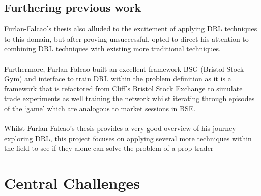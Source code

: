\documentclass[ %
                    author={Ashwinder Khurana},
                supervisor={Prof Dave Cliff},
                    degree={MEng},
                     title={The Deeply Reinforced Trader},
                  subtitle={},
                      type={enterprise},
                      year={2020} ]{dissertation}
\begin{document}
\subsection{Furthering previous work}
\label{subsection:Furthering previous work}
\vspace{0.5cm}
Furlan-Falcao's thesis \cite{falcao} also alluded to the excitement of applying DRL techniques to this domain, but after proving unsuccessful, opted to direct his attention to combining DRL techniques with existing more traditional techniques. 
\\
\\
Furthermore, Furlan-Falcao built an excellent framework BSG (Bristol Stock Gym) and interface to train DRL within the problem definition as it is a framework that is refactored from Cliff's Bristol Stock Exchange to simulate trade experiments as well training the network whilst iterating through episodes of the \enquote*{game} which are analogous to market sessions in BSE.
\\
\\
Whilst Furlan-Falcao's thesis provides a very good overview of his journey exploring DRL, this project focuses on applying several more techniques within the field to see if they alone can solve the problem of a prop trader

\vspace{0.5cm}
\section{Central Challenges}
\label{section:Central Challenges}
\vspace{0.5cm} 
\end{document}
